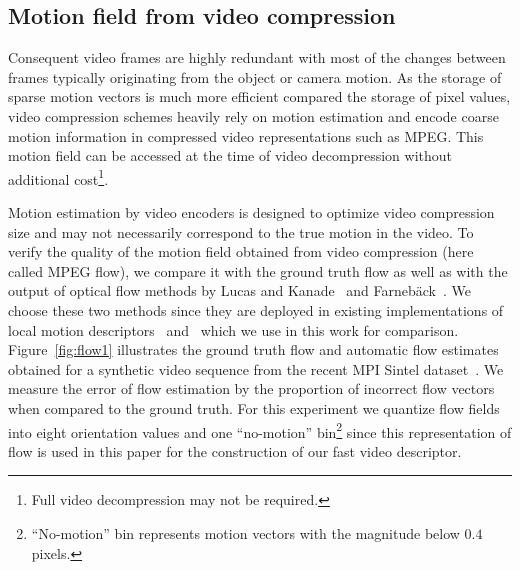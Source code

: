 \documentclass[10pt,twocolumn,letterpaper]{article}
\begin{document}
\subsection{Motion field from video compression}
Consequent video frames are highly redundant with most of the changes between frames typically originating from the object or camera motion. As the storage of sparse motion vectors is much more efficient compared the storage of pixel values, video compression schemes heavily rely on motion estimation and encode coarse motion information in compressed video representations such as MPEG. This motion field can be accessed at the time of video decompression without additional cost\footnote{Full video decompression may not be required.}. %

Motion estimation by video encoders is designed to optimize video compression size and may not necessarily correspond to the true motion in the video. To verify the quality of the motion field obtained from video compression (here called MPEG flow), we compare it with the ground truth flow as well as with the output of optical flow methods by Lucas and Kanade~\cite{Lucas81} and Farneb\"ack~\cite{Farneback03}. We choose these two methods since they are deployed in existing implementations of local motion descriptors~\cite{Laptev08} and~\cite{Wang12} which we use in this work for comparison. Figure~\ref{fig:flow1} illustrates the ground truth flow and automatic flow estimates obtained for a synthetic video sequence from the recent MPI Sintel dataset~\cite{Butler12}. We measure the error of flow estimation by the proportion of incorrect flow vectors when compared to the ground truth. For this experiment we quantize flow fields into eight orientation values and one ``no-motion'' bin\footnote{``No-motion'' bin represents motion vectors with the magnitude below $0.4$ pixels.} since this representation of flow is used in this paper for the construction of our fast video descriptor.

\end{document}
